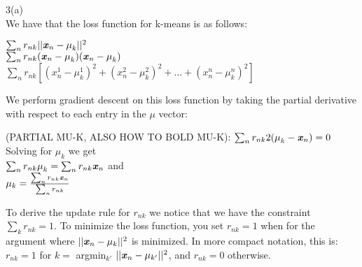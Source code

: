 \documentclass[12pt]{scrartcl}
\begin{document}
3(a) \\

We have that the loss function for k-means is as follows: \\

\begin{center}
$\sum_n r_{nk} ||\textbf{\textit{x}}_n - \textit{\textbf{$\mu$}}_k||^2$  \\
$\sum_n r_{nk} (\textbf{\textit{x}}_n - \textit{\textbf{$\mu$}}_k)(\textbf{\textit{x}}_n - \textit{\textbf{$\mu$}}_k)$ \\
$\sum_n r_{nk} [(x_n^1 - \mu_k^1)^2 + (x_n^2 - \mu_k^2)^2 + \ldots + (x_n^n - \mu_k^n)^2]$ \\
\end{center}


We perform gradient descent on this loss function by taking the partial derivative with respect to each entry in the \textbf{\textit{$\mu$}} vector: \\

\begin{center}
(PARTIAL MU-K, ALSO HOW TO BOLD MU-K): $\sum_n r_{nk} 2(\textbf{\textit{$\mu$}}_k - \textbf{\textit{x}}_n) = 0$\\

Solving for $\mu_k$ we get \\

$\sum_n r_{nk} \textbf{\textit{$\mu$}}_k = \sum_n r_{nk} \textbf{\textit{x}}_n$ and \\
$\mu_k = \frac{\sum_n r_{nk} \textbf{\textit{x}}_n}{\sum_n r_{nk}}$
\end{center}

To derive the update rule for $r_{nk}$ we notice that we have the constraint $\sum_k r_{nk} = 1$. To minimize the loss function, you set $r_{nk} = 1$ when for the argument where $||\textbf{\textit{x}}_n - \mu_k||^2$ is minimized. In more compact notation, this is: \\

$r_{nk} = 1$ for $k = $ argmin$_{k'}$ $||\textbf{\textit{x}}_n - \mu_{k'}||^2$, and $r_{nk} = 0 $ otherwise.
\end{document}
